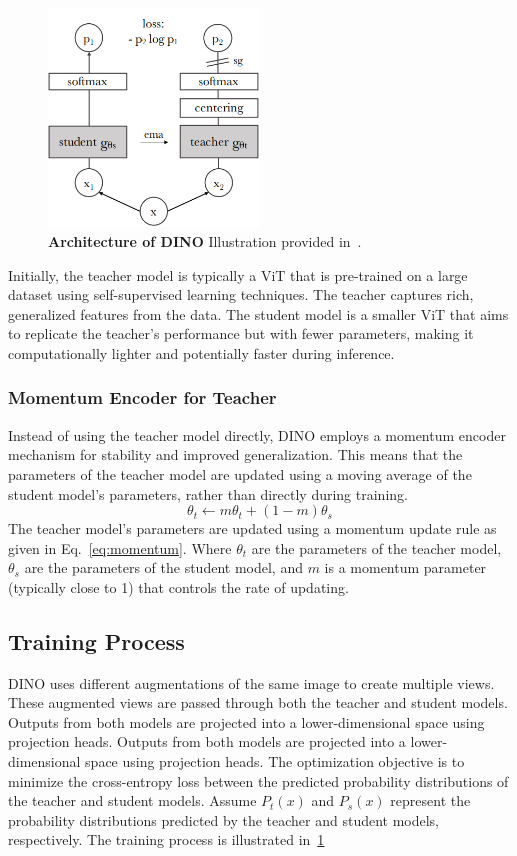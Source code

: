 \begin{figure}
	\centering
	\includegraphics[width=0.5\textwidth]{Images/main/dino.png}
	\caption[\textbf{DINO Architecture }]{\textbf{Architecture of DINO} Illustration provided in~\cite{caron2021emerging}.}
	\label{fig:dino}
\end{figure} 
 
 Initially, the teacher model is typically a ViT that is pre-trained on a large dataset using self-supervised learning techniques. The teacher captures rich, generalized features from the data. The student model is a smaller ViT that aims to replicate the teacher's performance but with fewer parameters, making it computationally lighter and potentially faster during inference.
 
\subsubsection{Momentum Encoder for Teacher}
Instead of using the teacher model directly, DINO employs a momentum encoder mechanism for stability and improved generalization. This means that the parameters of the teacher model are updated using a moving average of the student model's parameters, rather than directly during training.
\begin{equation}
	\label{eq:momentum}
	\theta_t \leftarrow m \theta_t + (1 - m) \theta_s
\end{equation}
The teacher model's parameters are updated using a momentum update rule as given in Eq.~\ref{eq:momentum}. Where \(\theta_t\) are the parameters of the teacher model, \(\theta_s\) are the parameters of the student model, and \(m\) is a momentum parameter (typically close to 1) that controls the rate of updating.

\subsection{Training Process}
DINO uses different augmentations of the same image to create multiple views. These augmented views are passed through both the teacher and student models. Outputs from both models are projected into a lower-dimensional space using projection heads. Outputs from both models are projected into a lower-dimensional space using projection heads. The optimization objective is to minimize the cross-entropy loss between the predicted probability distributions of the teacher and student models. Assume \(P_t(x)\) and \(P_s(x)\) represent the probability distributions predicted by the teacher and student models, respectively. The training process is illustrated in~\ref{fig:dino}

